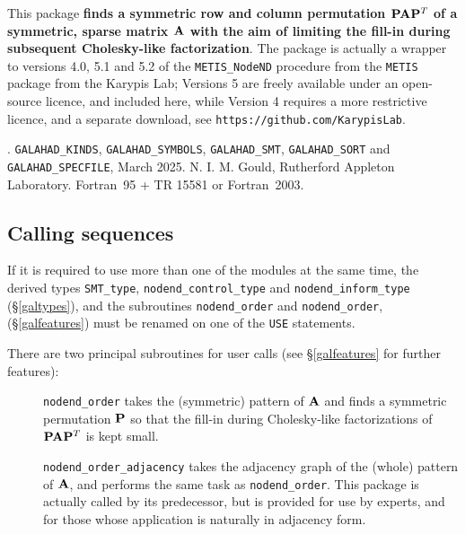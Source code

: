 \documentclass{galahad}
\newcommand{\packagename}{nodend}
\newcommand{\fullpackagename}{\libraryname\_\-\packagename}
\begin{document}
\galheader


\galsummary

This package
{\bf finds a symmetric row and column permutation ${\mathbf{P}} {\mathbf{A}} {\mathbf{P}}^T$ 
of a symmetric, sparse matrix ${\mathbf{A}}$ with the aim of limiting 
the fill-in during subsequent Cholesky-like factorization}. 
The package is actually a wrapper to versions 4.0, 5.1 and 5.2 of the
{\tt METIS\_NodeND} procedure from 
the {\tt METIS} package from the Karypis Lab; Versions 5 are freely 
available under an open-source licence, and included here, 
while Version 4 requires a more restrictive licence, and a separate download, 
see {\tt https://github.com/KarypisLab}.


\galattributes
\galversions{\tt  \fullpackagename\_single, \fullpackagename\_double}.
\galcalls
{\tt GALAHAD\-\_KINDS},
{\tt GALAHAD\-\_SYMBOLS},
{\tt GALAHAD\_SMT},
{\tt GALAHAD\_\-SORT}
and 
{\tt GALAHAD\_SPECFILE},
\galdate March 2025.
\galorigin N. I. M. Gould, Rutherford Appleton Laboratory.
\gallanguage Fortran~95 + TR 15581 or Fortran~2003.


\galhowto

\subsection{Calling sequences}



\noindent
If it is required to use more than one of the modules at the same time, 
the derived types
{\tt SMT\_type},
{\tt \packagename\_control\_type}
and
{\tt \packagename\_inform\_type}
(\S\ref{galtypes}),
and the subroutines
{\tt \packagename\-\_order}
and
{\tt \packagename\-\_order},
(\S\ref{galfeatures})
must be renamed on one of the {\tt USE} statements.

\noindent There are two principal subroutines for user calls (see
\S\ref{galfeatures} for further features):

\begin{description}

\item[] {\tt \packagename\_order} takes the (symmetric) pattern of ${\mathbf{A}}$
 and finds a symmetric permutation ${\mathbf{P}}$ so that the fill-in
 during Cholesky-like factorizations of ${\mathbf{P}} {\mathbf{A}} {\mathbf{P}}^T$
 is kept small.

\item[] {\tt \packagename\_order\_adjacency} takes the adjacency graph of 
 the (whole) pattern of ${\mathbf{A}}$, and performs the same task as
 {\tt \packagename\_order}. This package is actually called
 by its predecessor, but is provided for use by experts, and for
 those whose application is naturally in adjacency form.
\end{description}
\end{document}
